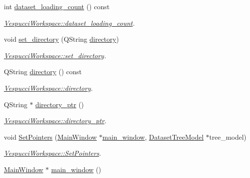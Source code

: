 \begin{DoxyCompactItemize}
\item 
int \hyperlink{class_vespucci_workspace_a330132202e0dcc599d5ef892d2f52eb4}{dataset\+\_\+loading\+\_\+count} () const 
\begin{DoxyCompactList}\small\item\em \hyperlink{class_vespucci_workspace_a330132202e0dcc599d5ef892d2f52eb4}{Vespucci\+Workspace\+::dataset\+\_\+loading\+\_\+count}. \end{DoxyCompactList}\item 
void \hyperlink{class_vespucci_workspace_afb93dcaa201f7ee3a847154a4ddbcbbc}{set\+\_\+directory} (Q\+String \hyperlink{class_vespucci_workspace_a1cf453891cf654c9117338490a5ea5ba}{directory})
\begin{DoxyCompactList}\small\item\em \hyperlink{class_vespucci_workspace_afb93dcaa201f7ee3a847154a4ddbcbbc}{Vespucci\+Workspace\+::set\+\_\+directory}. \end{DoxyCompactList}\item 
Q\+String \hyperlink{class_vespucci_workspace_a1cf453891cf654c9117338490a5ea5ba}{directory} () const 
\begin{DoxyCompactList}\small\item\em \hyperlink{class_vespucci_workspace_a1cf453891cf654c9117338490a5ea5ba}{Vespucci\+Workspace\+::directory}. \end{DoxyCompactList}\item 
Q\+String $\ast$ \hyperlink{class_vespucci_workspace_a6de7f2e3c03a97e22d78df1213ee61bf}{directory\+\_\+ptr} ()
\begin{DoxyCompactList}\small\item\em \hyperlink{class_vespucci_workspace_a6de7f2e3c03a97e22d78df1213ee61bf}{Vespucci\+Workspace\+::directory\+\_\+ptr}. \end{DoxyCompactList}\item 
void \hyperlink{class_vespucci_workspace_abf11a59ed19a63ebccea3adac48646c4}{Set\+Pointers} (\hyperlink{class_main_window}{Main\+Window} $\ast$\hyperlink{class_vespucci_workspace_a48a0bc8ab860ca6a66e7eaf9b803b78a}{main\+\_\+window}, \hyperlink{class_dataset_tree_model}{Dataset\+Tree\+Model} $\ast$tree\+\_\+model)
\begin{DoxyCompactList}\small\item\em \hyperlink{class_vespucci_workspace_abf11a59ed19a63ebccea3adac48646c4}{Vespucci\+Workspace\+::\+Set\+Pointers}. \end{DoxyCompactList}\item 
\hyperlink{class_main_window}{Main\+Window} $\ast$ \hyperlink{class_vespucci_workspace_a48a0bc8ab860ca6a66e7eaf9b803b78a}{main\+\_\+window} ()

\end{DoxyCompactItemize}
